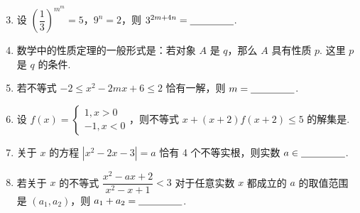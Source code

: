 \documentclass[a4paper,11pt]{article}
\begin{document}


\begin{enumerate}
\setcounter{enumi}{2}

\item 设 $\left(\dfrac13\right)^{m^m}=5$，$9^n=2$，则 $3^{2m+4n}=\blankline[4.4em]$.

\ifanswer
{}
\fi

\item 数学中的性质定理的一般形式是：若对象 $A$ 是 $q$，那么 $A$ 具有性质 $p$. 这里 $p$ 是 $q$ 的\blankline[4.4em]条件.

\ifanswer
{}
\fi

\item 若不等式 $-2\leqslant x^2-2mx+6\leqslant2$ 恰有一解，则 $m=\blankline[4.4em]$.

\ifanswer
{}
\fi

\item 设 $f(x)=\begin{cases}1,x>0\\ -1,x<0\end{cases}$，则不等式 $x+(x+2)f(x+2)\leqslant5$ 的解集是\blankline[4.4em].

\ifanswer
\solbegin
{}
\step{综上，原不等式的解集为 $(-\infty,-2)\cup(2,\dfrac32]$.}
\solend
\fi

\item 关于 $x$ 的方程 $|x^2-2x-3|=a$ 恰有 4 个不等实根，则实数 $a\in\blankline[4.4em]$.

\ifanswer
{}
\fi

\item 若关于 $x$ 的不等式 $\dfrac{x^2-ax+2}{x^2-x+1}<3$ 对于任意实数 $x$ 都成立的 $a$ 的取值范围是 $(a_1,a_2)$，则 $a_1+a_2=\blankline[4.4em]$.

\ifanswer
{}
\fi


\end{enumerate}
\end{document}
